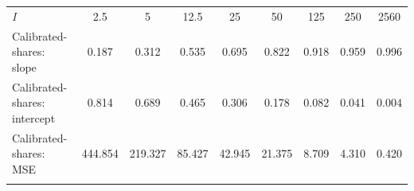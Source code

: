 \begin{tabular}{lcccccccc}
\hline \noalign{\smallskip}\textit{I} & 2.5 & 5 & 12.5 & 25 & 50 & 125 & 250 & 2560\\
\noalign{\smallskip}\hline \noalign{\smallskip}Calibrated-shares: slope & 0.187 & 0.312 & 0.535 & 0.695 & 0.822 & 0.918 & 0.959 & 0.996\\
Calibrated-shares: intercept & 0.814 & 0.689 & 0.465 & 0.306 & 0.178 & 0.082 & 0.041 & 0.004\\
Calibrated-shares: MSE & 444.854 & 219.327 & 85.427 & 42.945 & 21.375 & 8.709 & 4.310 & 0.420\\
\noalign{\smallskip}\hline\end{tabular}
